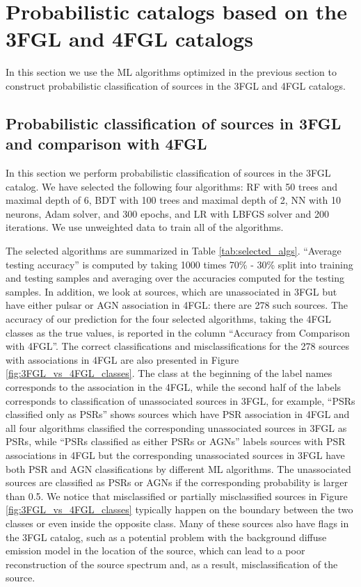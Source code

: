 \section{Probabilistic catalogs based on the 3FGL and 4FGL catalogs}

In this section we use the ML algorithms optimized in the previous section to construct probabilistic
classification of sources in the 3FGL and 4FGL catalogs.


\subsection{Probabilistic classification of sources in 3FGL and comparison with 4FGL}


In this section we perform probabilistic classification of sources in the 3FGL catalog.
We have selected the following four algorithms: RF with 50 trees and maximal depth of 6, BDT with 100 trees and maximal depth of 2, NN with 10 neurons, Adam solver, and 300 epochs, and LR with LBFGS solver and 200 iterations. We use unweighted data to train all of the algorithms.

The selected algorithms are summarized in Table \ref{tab:selected_algs}.
``Average testing accuracy'' is computed by taking 1000 times 70\% - 30\% split into training and testing samples and averaging over the 
accuracies computed for the testing samples.
In addition, we look at sources, which are unassociated in 3FGL but have either pulsar or AGN association in 4FGL: there are 278 such sources.
The accuracy of our prediction for the four selected algorithms, taking the 4FGL classes as the true values, is reported in the column ``Accuracy from Comparison with 4FGL''.
The correct classifications and misclassifications for the 278 sources with associations in 4FGL are also presented in Figure \ref{fig:3FGL_vs_4FGL_classes}.
The class at the beginning of the label names corresponds to the association in the 4FGL, while the second half of the labels corresponds to classification of unassociated sources in 3FGL, for example, ``PSRs classified only as PSRs'' shows sources which have PSR association in 4FGL and all four algorithms classified the corresponding unassociated sources in 3FGL as PSRs, while ``PSRs classified as either PSRs or AGNs'' labels sources with PSR associations in 4FGL but the corresponding unassociated sources in 3FGL have both PSR and AGN classifications by different ML algorithms.
The unassociated sources are classified as PSRs or AGNs if the corresponding probability is larger than 0.5.
We notice that misclassified or partially misclassified sources in Figure \ref{fig:3FGL_vs_4FGL_classes} typically happen on the boundary between the two classes or even inside the opposite class.
Many of these sources also have flags in the 3FGL catalog, such as a potential problem with the background diffuse emission model in the location of the source, which can lead to a poor reconstruction of the source spectrum and, as a result, misclassification of the source.

